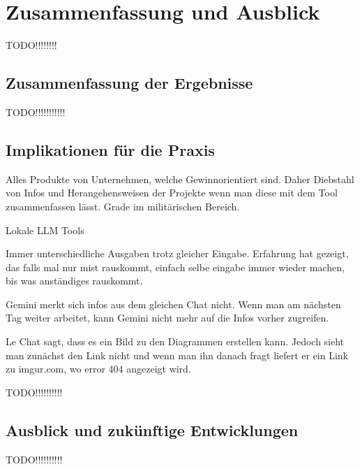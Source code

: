 
\chapter{Zusammenfassung und Ausblick} 

TODO!!!!!!!!

\section{Zusammenfassung der Ergebnisse}  \label{Zusammenfassung der Ergebnisse}

TODO!!!!!!!!!!!

\section{Implikationen für die Praxis}  \label{Implikationen für die Praxis}

Alles Produkte von Unternehmen, welche Gewinnorientiert sind. Daher Diebstahl von Infos und Herangehensweisen der Projekte 
wenn man diese mit dem Tool zusammenfassen lässt. Grade im militärischen Bereich.

Lokale LLM Tools

Immer unterschiedliche Ausgaben trotz gleicher Eingabe. Erfahrung hat gezeigt, das falls mal nur mist rauskommt, einfach selbe eingabe 
immer wieder machen, bis was anständiges rauskommt.

Gemini merkt sich infos aus dem gleichen Chat nicht. Wenn man am nächsten Tag weiter arbeitet, kann Gemini nicht mehr auf die Infos vorher 
zugreifen.

Le Chat sagt, dass es ein Bild zu den Diagrammen erstellen kann. Jedoch sieht man zunächst den Link nicht und wenn man ihn danach fragt 
liefert er ein Link zu imgur.com, wo error 404 angezeigt wird.

TODO!!!!!!!!!!

\section{Ausblick und zukünftige Entwicklungen}  \label{Ausblick und zukünftige Entwicklungen}

TODO!!!!!!!!!!